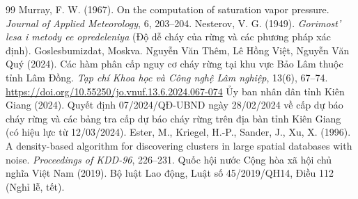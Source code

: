 \documentclass[12pt,a4paper]{article}
\begin{document}
\begin{thebibliography}{99}
 Murray, F. W. (1967). On the computation of saturation vapor pressure. \textit{Journal of Applied Meteorology}, 6, 203--204.
 Nesterov, V. G. (1949). \textit{Gorimost' lesa i metody ee opredeleniya} (Độ dễ cháy của rừng và các phương pháp xác định). Goslesbumizdat, Moskva.
 Nguyễn Văn Thêm, Lê Hồng Việt, Nguyễn Văn Quý (2024). Các hàm phân cấp nguy cơ cháy rừng tại khu vực Bảo Lâm thuộc tỉnh Lâm Đồng. \textit{Tạp chí Khoa học và Công nghệ Lâm nghiệp}, 13(6), 67--74. \url{https://doi.org/10.55250/jo.vnuf.13.6.2024.067-074}
 Ủy ban nhân dân tỉnh Kiên Giang (2024). Quyết định 07/2024/QĐ-UBND ngày 28/02/2024 về cấp dự báo cháy rừng và các bảng tra cấp dự báo cháy rừng trên địa bàn tỉnh Kiên Giang (có hiệu lực từ 12/03/2024).
 Ester, M., Kriegel, H.-P., Sander, J., Xu, X. (1996). A density-based algorithm for discovering clusters in large spatial databases with noise. \textit{Proceedings of KDD-96}, 226--231.
 Quốc hội nước Cộng hòa xã hội chủ nghĩa Việt Nam (2019). Bộ luật Lao động, Luật số 45/2019/QH14, Điều 112 (Nghỉ lễ, tết).
\end{thebibliography}
\end{document}
